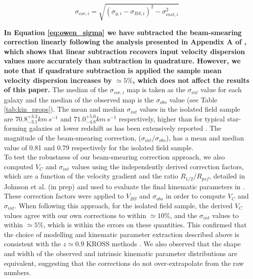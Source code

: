\documentclass[fleqn,usenatbib]{mnras}
\begin{document}
\begin{equation}\label{eq:owen_sigma}
\sigma_{cor,i} = \sqrt{\left(\sigma_{g,i} - \sigma_{BS,i}\right)^{2} - \sigma_{inst,i}^{2}}
\end{equation}

\textbf{In Equation \ref{eq:owen_sigma} we have subtracted the beam-smearing correction linearly following the analysis presented in Appendix A of \cite{Stott2016}, which shows that linear subtraction recovers input velocity dispersion values more accurately than subtraction in quadrature. However, we note that if quadrature subtraction is applied the sample mean velocity dispersion increases by $\simeq 5\%$, which does not affect the results of this paper.}
The median of the $\sigma_{cor,i}$ map is taken as the $\sigma_{int}$ value for each galaxy and the median of the observed map is the $\sigma_{obs}$ value (see Table \ref{tab:kin_props}).
The mean and median $\sigma_{int}$ values in the isolated field sample are $70.8^{+3.3}_{-3.1} km\,s^{-1}$ and $71.0^{+5.0}_{-4.8} km\,s^{-1}$ respectively, higher than for typical star-forming galaxies at lower redshift as has been extensively reported \citep[e.g.][]{Genzel2006,Genzel2008,ForsterSchreiber2009,Law2009,Gnerucci2011,Epinat2012,Wisnioski2015}.
The magnitude of the beam-smearing correction, ($\sigma_{int}/\sigma_{obs}$), has a mean and median value of 0.81 and 0.79 respectively for the isolated field sample. \\


To test the robustness of our beam-smearing correction approach, we also computed $V_{C}$ and $\sigma_{int}$ values using the independently derived correction factors, which are a function of the velocity gradient and the ratio $R_{1/2}/R_{psf}$, detailed in Johnson et al. (in prep) and used to evaluate the final kinematic parameters in \cite{Harrison2017}.
These correction factors were applied to $V_{BS}$ and $\sigma_{obs}$ in order to compute $V_{C}$ and $\sigma_{int}$.
When following this approach, for the isolated field sample, the derived $V_{C}$ values agree with our own corrections to within $\simeq10\%$, and the $\sigma_{int}$ values to within $\simeq5\%$, which is within the errors on these quantities. 
This confirmed that the choice of modelling and kinematic parameter extraction described above is consistent with the $z\simeq0.9$ KROSS methods \citep{Harrison2017}.
We also observed that the shape and width of the observed and intrinsic kinematic parameter distributions are equivalent, suggesting that the corrections do not over-extrapolate from the raw numbers.
\end{document}
